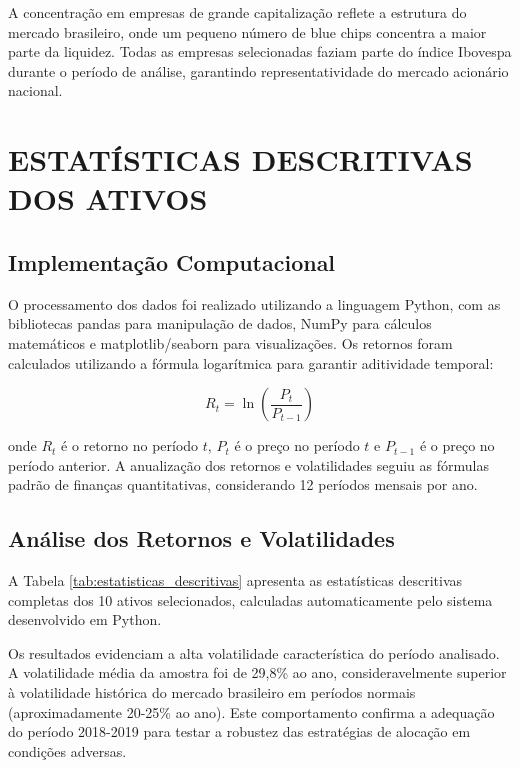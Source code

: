 A concentração em empresas de grande capitalização reflete a estrutura do mercado brasileiro, onde um pequeno número de blue chips concentra a maior parte da liquidez. Todas as empresas selecionadas faziam parte do índice Ibovespa durante o período de análise, garantindo representatividade do mercado acionário nacional.

\section{ESTATÍSTICAS DESCRITIVAS DOS ATIVOS}

\subsection{Implementação Computacional}

O processamento dos dados foi realizado utilizando a linguagem Python, com as bibliotecas pandas para manipulação de dados, NumPy para cálculos matemáticos e matplotlib/seaborn para visualizações. Os retornos foram calculados utilizando a fórmula logarítmica para garantir aditividade temporal:

\begin{equation}
R_t = \ln\left(\frac{P_t}{P_{t-1}}\right)
\end{equation}

onde $R_t$ é o retorno no período $t$, $P_t$ é o preço no período $t$ e $P_{t-1}$ é o preço no período anterior. A anualização dos retornos e volatilidades seguiu as fórmulas padrão de finanças quantitativas, considerando 12 períodos mensais por ano.

\subsection{Análise dos Retornos e Volatilidades}

A Tabela \ref{tab:estatisticas_descritivas} apresenta as estatísticas descritivas completas dos 10 ativos selecionados, calculadas automaticamente pelo sistema desenvolvido em Python.



Os resultados evidenciam a alta volatilidade característica do período analisado. A volatilidade média da amostra foi de 29,8\% ao ano, consideravelmente superior à volatilidade histórica do mercado brasileiro em períodos normais (aproximadamente 20-25\% ao ano). Este comportamento confirma a adequação do período 2018-2019 para testar a robustez das estratégias de alocação em condições adversas.

